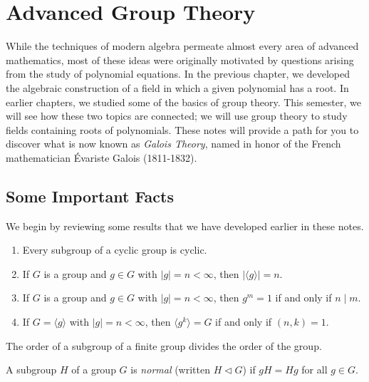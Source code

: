 \chapter{Advanced Group Theory}

While the techniques of modern algebra permeate almost every area of advanced mathematics, most of these ideas were originally motivated by questions arising from the study of polynomial equations. In the previous chapter, we developed the algebraic construction of a field in which a given polynomial has a root. In earlier chapters, we studied some of the basics of group theory. This semester, we will see how these two topics are connected; we will use group theory to study fields containing roots of polynomials. These notes will provide a path for you to discover what is now known as \textit{Galois Theory}, named in honor of the French mathematician \'{E}variste Galois (1811-1832).

\section{Some Important Facts}

We begin by reviewing some results that we have developed earlier in these notes.

\begin{theorem} \mbox{}
 \begin{enumerate}\renewcommand{\theenumi}{\alph{enumi}}
  \item
        Every subgroup of a cyclic group is cyclic.
  \item
        If $G$ is a group and $g\in G$ with $|g|=n<\infty$, then $|\langle g \rangle|=n$.
  \item
        If $G$ is a group and $g\in G$ with $|g|=n<\infty$, then $g^m = 1$ if and only if $n \mid m$.
  \item
        If $G = \langle g \rangle$ with $|g|=n<\infty$, then $\langle g^k \rangle = G$  if and only if $(n,k)=1$.
 \end{enumerate}
\end{theorem}

\begin{theorem}[Lagrange]
 The order of a subgroup of a finite group divides the order of the group.
\end{theorem}

\begin{definition}
 A subgroup $H$ of a group $G$ is \textit{normal} (written $H\lhd G$) if $gH = Hg$ for all $g\in G$.
\end{definition}

